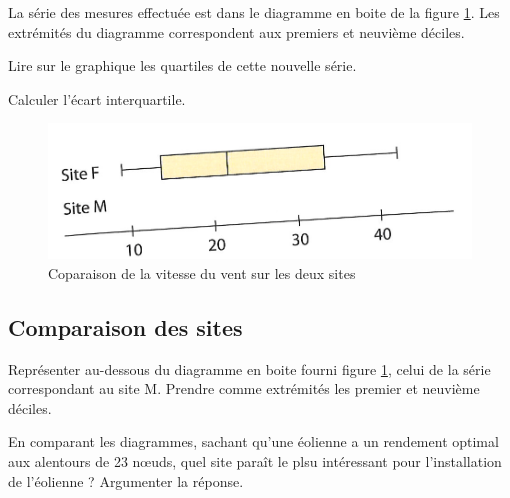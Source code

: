 La série des mesures effectuée est dans le diagramme en boite de la figure \ref{fig:comparaison}. Les extrémités du diagramme correspondent aux premiers et neuvième déciles.

\begin{questions}
	
	\question Lire sur le graphique les quartiles de cette nouvelle série.
	
	\question Calculer l'écart interquartile.
\end{questions}

\begin{figure}[b]
	\begin{center}
		\includegraphics[scale=1.2]{moustache}
	\end{center}
	\caption{Coparaison de la vitesse du vent sur les deux sites}
	\label{fig:comparaison}
\end{figure}

\subsection{Comparaison des sites}\label{part:comp}

\begin{questions}
	\question Représenter au-dessous du diagramme en boite fourni figure \ref{fig:comparaison}, celui de la série correspondant au site M. Prendre comme extrémités les premier et neuvième déciles.
	
	\question En comparant les diagrammes, sachant qu'une éolienne a un rendement optimal aux alentours de 23 n\oe uds, quel site paraît le plsu intéressant pour l'installation de l'éolienne ? Argumenter la réponse. 
\end{questions}